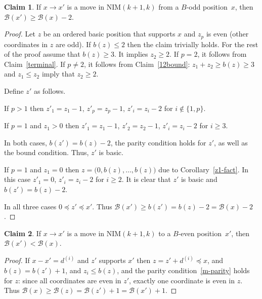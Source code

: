 \documentclass{article}
\theoremstyle{definition}
\newtheorem{claim}{Claim}
\def\mv#1{d^{(#1)}}
\def\B{\mathcal{B}}
\begin{document}
\begin{claim}\label{DeltaGodd}
  If $x\to x'$ is a move in \textup{NIM}$(k+1,k)$ from a $B$-odd position~$x$, then  $\B(x') \geq \B(x)-2$.
\end{claim}
\begin{proof}
  Let $z$ be an ordered basic position that supports $x$ and $z_p$ is even (other coordinates in $z$ are odd). If $b(z)\leq 2$ then the claim trivially holds. For the rest of the proof assume that $b(z) \geq 3$. It implies $z_2\geq2$. If $p=2$, it follows from Claim~\ref{terminal}. If $p\ne2$, it follows from Claim~\ref{12bound}: $z_1+z_2\geq b(z)\geq 3$ and $z_1\leq z_2$ imply that   $z_2\geq 2$.
  
  Define $z'$ as follows.

  If $p>1$ then $z'_1=z_1-1$, $z'_p=z_p-1 $,   $z'_i= z_i-2$ for $i\notin \{1,p\}$.

  If $p=1$ and $z_1>0$ then  $z'_1=z_1-1$, $z'_2=z_2-1 $,   $z'_i= z_i-2$ for $i\geq3$.

In both cases, $b(z') =b(z)-2 $, the parity condition holds for $z'$, as well as the bound condition. Thus, $z'$ is basic.
  
  If $p=1$ and $z_1=0$ then $z=\big(0,b(z),\dots, b(z)\big)$ due to Corollary~\ref{z1-fact}. In this case $z'_1 = 0$, $z'_i = z_i-2$ for $i\geq2$.
It is clear that $z'$ is basic and $b(z')= b(z)-2$.
  
In all three cases $0\preceq z'\preceq x'$. Thus $\B(x')\geq b(z') = b(z)-2=\B(x)-2$.
\end{proof}

\begin{claim}\label{ToGeven}
  If $x\to x'$ is a move in \textup{NIM}$(k+1,k)$ to a $B$-even position~$x'$, then  $\B(x')< \B(x)$.
\end{claim}
\begin{proof}
  If $x-x' = \mv{i}$ and  $z'$ supports $x'$ then $z=z'+\mv{i}\preceq x$, and $b(z) = b(z')+1$, and $z_i\leq b(z) $,  and the parity condition~\eqref{m-parity} holds for $z$: since  all coordinates are even in $z'$, exactly one coordinate is even in $z$. Thus $\B(x)\geq \B(z) = \B(z')+1 = \B(x')+1$.
\end{proof}
\end{document}
